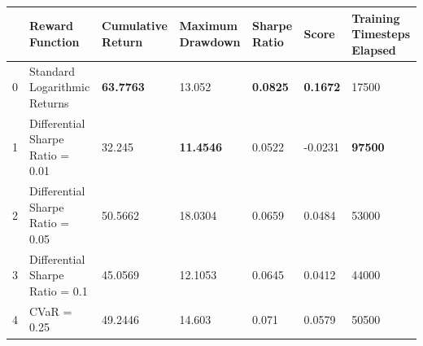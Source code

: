 \begin{tabular}{lllllll}
\toprule
 & Reward Function & Cumulative Return & Maximum Drawdown & Sharpe Ratio & Score & Training Timesteps Elapsed \\
\midrule
0 & Standard Logarithmic Returns & \textbf{63.7763} & 13.052 & \textbf{0.0825} & \textbf{0.1672} & 17500 \\
1 & Differential Sharpe Ratio = 0.01 & 32.245 & \textbf{11.4546} & 0.0522 & -0.0231 & \textbf{97500} \\
2 & Differential Sharpe Ratio = 0.05 & 50.5662 & 18.0304 & 0.0659 & 0.0484 & 53000 \\
3 & Differential Sharpe Ratio = 0.1 & 45.0569 & 12.1053 & 0.0645 & 0.0412 & 44000 \\
4 & CVaR = 0.25 & 49.2446 & 14.603 & 0.071 & 0.0579 & 50500 \\
\bottomrule
\end{tabular}
